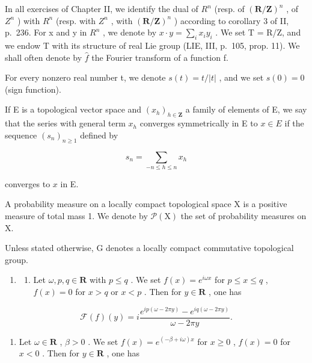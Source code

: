 
In all exercises of Chapter II, we identify the dual of \(R^{n}\) (resp. of \((\mathbf{R}/\mathbf{Z})^{n}\) , of \(Z^{n}\) ) with \(R^{n}\) (resp. with \(Z^{n}\) , with \((\mathbf{R}/\mathbf{Z})^{n}\) ) according to corollary 3 of II, p.~236. For x and y in \(R^{n}\) , we denote by \(x \cdot y = \sum_{i} x_{i} y_{i}\) . We set T = R/Z, and we endow T with its structure of real Lie group (LIE, III, p.~105, prop. 11). We shall often denote by \(\widehat{f}\) the Fourier transform of a function f.

For every nonzero real number t, we denote \(s(t) = t/|t|\) , and we set \(s(0) = 0\) (sign function).

If E is a topological vector space and \((x_{h})_{h\in\mathbf{Z}}\) a family of elements of E, we say that the series with general term \(x_{h}\) converges symmetrically in E to \(x\in E\) if the sequence \((s_{n})_{n\geqslant1}\) defined by

\[
s _ {n} = \sum_ {- n \leqslant h \leqslant n} x _ {h}
\]

converges to \(x\) in E.

A probability measure on a locally compact topological space X is a positive measure of total mass 1. We denote by \(\mathcal{P}(\mathrm{X})\) the set of probability measures on X.

Unless stated otherwise, G denotes a locally compact commutative topological group.
\relax{}

\begin{enumerate}
\def\labelenumi{\arabic{enumi})}
\tightlist
\item
  \begin{enumerate}
  \def\labelenumii{\alph{enumii})}
  \tightlist
  \item
    Let \(\omega, p, q \in \mathbf{R}\) with \(p \leqslant q\) . We set \(f(x) = e^{i\omega x}\) for \(p \leqslant x \leqslant q\) , \(f(x) = 0\) for \(x > q\) or \(x < p\) . Then for \(y \in \mathbf{R}\) , one has
  \end{enumerate}
\end{enumerate}

\[
\mathcal {F} (f) (y) = i \frac {e ^ {i p (\omega - 2 \pi y)} - e ^ {i q (\omega - 2 \pi y)}}{\omega - 2 \pi y}.
\]

\begin{enumerate}
\def\labelenumi{\alph{enumi})}
\setcounter{enumi}{1}
\tightlist
\item
  Let \(\omega \in \mathbf{R}\) , \(\beta > 0\) . We set \(f(x) = e^{(-\beta + i\omega)x}\) for \(x \geqslant 0\) , \(f(x) = 0\) for \(x < 0\) . Then for \(y \in \mathbf{R}\) , one has
\end{enumerate}

